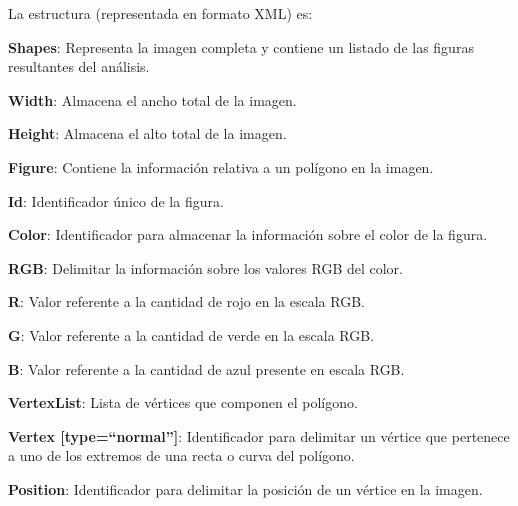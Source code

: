	La estructura (representada en formato XML) es:\\
	
	
	\begin{longenum}
	\item \textbf{Shapes}: Representa la imagen completa y contiene un listado de las figuras resultantes del análisis.
	\item \textbf{Width}: Almacena el ancho total de la imagen.
	\item \textbf{Height}: Almacena el alto total de la imagen.
	\item \textbf{Figure}: Contiene la información relativa a un polígono en la imagen.
		\begin{longenum}
		\item \textbf{Id}: Identificador único de la figura.
		\item \textbf{Color}: Identificador para almacenar la información sobre el color de la figura.
			\begin{longenum}
			\item \textbf {RGB}: Delimitar la información sobre los valores RGB del color.
				\begin{longenum}
				\item \textbf{R}: Valor referente a la cantidad de rojo en la escala RGB.
				\item \textbf{G}: Valor referente a la cantidad de verde en la escala RGB.
				\item \textbf{B}: Valor referente a la cantidad de azul presente en escala RGB.
				\end{longenum}
			\end{longenum}
		\item \textbf{VertexList}: Lista de vértices que componen el polígono.
			\begin{longenum}
			\item \textbf{Vertex [type=``normal'']}: Identificador para delimitar un vértice que pertenece a uno de los extremos de una recta o curva del polígono.
				\begin{longenum}
					\item \textbf{Position}: Identificador para delimitar la posición de un vértice en la imagen.
						\begin{longenum}

\end{longenum}
\end{longenum}
\end{longenum}
\end{longenum}
\end{longenum}
